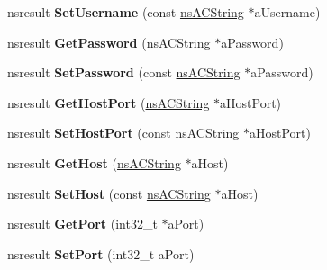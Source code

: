 \begin{DoxyCompactItemize}
\item 
\mbox{\label{interfacens_i_u_r_i_a6d9a2c30d3825bad808ff360a1c6f12c}} 
nsresult {\bfseries Set\+Username} (const \hyperlink{structns_c_string_container}{ns\+A\+C\+String} $\ast$a\+Username)
\item 
\mbox{\label{interfacens_i_u_r_i_ac22d7aa684ae49547b65639729ddada6}} 
nsresult {\bfseries Get\+Password} (\hyperlink{structns_c_string_container}{ns\+A\+C\+String} $\ast$a\+Password)
\item 
\mbox{\label{interfacens_i_u_r_i_ac46771565a1ccb7940b898ecc2d75643}} 
nsresult {\bfseries Set\+Password} (const \hyperlink{structns_c_string_container}{ns\+A\+C\+String} $\ast$a\+Password)
\item 
\mbox{\label{interfacens_i_u_r_i_a5e9b053ec44fd10fe034447a8a7d59e6}} 
nsresult {\bfseries Get\+Host\+Port} (\hyperlink{structns_c_string_container}{ns\+A\+C\+String} $\ast$a\+Host\+Port)
\item 
\mbox{\label{interfacens_i_u_r_i_a29df8865f56ea20ea295986ddcace6c9}} 
nsresult {\bfseries Set\+Host\+Port} (const \hyperlink{structns_c_string_container}{ns\+A\+C\+String} $\ast$a\+Host\+Port)
\item 
\mbox{\label{interfacens_i_u_r_i_a2a364d1043259623b698e644bf17bf1d}} 
nsresult {\bfseries Get\+Host} (\hyperlink{structns_c_string_container}{ns\+A\+C\+String} $\ast$a\+Host)
\item 
\mbox{\label{interfacens_i_u_r_i_ab28ebea88013e036a653cc227ff513ad}} 
nsresult {\bfseries Set\+Host} (const \hyperlink{structns_c_string_container}{ns\+A\+C\+String} $\ast$a\+Host)
\item 
\mbox{\label{interfacens_i_u_r_i_afc6a243e4b1337b63346518adbb20921}} 
nsresult {\bfseries Get\+Port} (int32\+\_\+t $\ast$a\+Port)
\item 
\mbox{\label{interfacens_i_u_r_i_a186120165fa59f498b3731bbbdfb37f5}} 
nsresult {\bfseries Set\+Port} (int32\+\_\+t a\+Port)
\item 

\end{DoxyCompactItemize}

